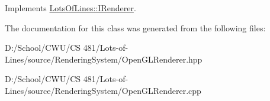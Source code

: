 Implements \hyperlink{class_lots_of_lines_1_1_i_renderer_ac2c690247d805c68839ec7a831133665}{Lots\+Of\+Lines\+::\+I\+Renderer}.



The documentation for this class was generated from the following files\+:\begin{DoxyCompactItemize}
\item 
D\+:/\+School/\+C\+W\+U/\+C\+S 481/\+Lots-\/of-\/\+Lines/source/\+Rendering\+System/Open\+G\+L\+Renderer.\+hpp\item 
D\+:/\+School/\+C\+W\+U/\+C\+S 481/\+Lots-\/of-\/\+Lines/source/\+Rendering\+System/Open\+G\+L\+Renderer.\+cpp\end{DoxyCompactItemize}
